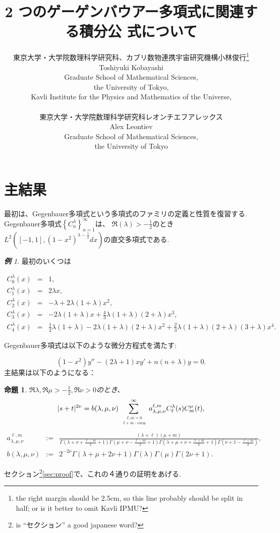 \documentclass[12pt]{article} %
\title{2 つのゲーゲンバウアー多項式に関連する積分公 式について}
\author{東京大学・大学院数理科学研究科、カブリ数物連携宇宙研究機構\quad 小林\quad 俊行\footnote{
the right margin should be 2.5cm, so this line probably should be split in half; or is it better to omit Kavli IPMU?}\\
Toshiyuki Kobayashi\\
Graduate School of Mathematical Sciences,\\
the University of Tokyo,\\
Kavli Institute for the Physics and Mathematics of the Universe,\\\\
東京大学・大学院数理科学研究科\quad レオンチエフ\quad アレックス\\
Alex Leontiev\\
Graduate School of Mathematical Sciences,\\
the University of Tokyo
}
\date{} %
\newtheorem{prop}{命題}
\theoremstyle{remark}
\newtheorem*{example*}{\textbf{例}}
\newcommand{\tmop}[1]{\ensuremath{\operatorname{#1}}}
\begin{document}
\maketitle

\section{主結果}
	最初は、Gegenbauer多項式という多項式のファミリの定義と性質を復習する.
	Gegenbauer多項式$\left\{ C_n^\lambda \right\}_{n=1}^{\infty}$は、
	$\Re(\lambda)>-\frac{1}{2}$のとき$L^2\left( [-1,1],(1-x^2)^{\lambda-\frac{1}{2}}dx \right)$の直交多項式である.
	
	\begin{example*}
		最初のいくつは
	
		\begin{eqnarray*}
			C_0^\lambda(x)&=&1,\\
			C_1^\lambda(x)&=&2\lambda x,\\
			C_2^\lambda(x)&=&-\lambda+2\lambda(1+\lambda)x^2,\\
			C_3^\lambda(x)&=&-2\lambda(1+\lambda)x+\frac{4}{3}\lambda(1+\lambda)(2+\lambda)x^3,\\
			C_4^\lambda(x)&=&\frac{1}{2}\lambda(1+\lambda)-2\lambda(1+\lambda)(2
			+\lambda)x^2+\frac{2}{3}\lambda(1+\lambda)(2+\lambda)(3+\lambda)x^4.
		\end{eqnarray*}
	\end{example*}
	Gegenbauer多項式は以下のような微分方程式を満たす:
		
	\begin{equation*}
		(1-x^2)y''-(2\lambda+1)xy'+n(n+\lambda)y=0.
	\end{equation*}
	主結果は以下のようになる：
	\begin{prop}\label{prop:exp-st-gg}
		$\Re\lambda,\Re\mu>-\frac{1}{2},\Re\nu>0$のとき、
		\begin{equation}
			| s + t |^{2 \nu} =b(\lambda,\mu,\nu) \displaystyle\sum_{\scalebox{0.6}{ $\begin{array}[]{c}
			\ell, m = 0 \\ \ell + m : \tmop{even}
		\end{array}$}}^{\infty} a_{\lambda,\mu,\nu}^{\ell,m} C_\ell^{\lambda} (s) C_m^{\mu} (t),
			\label{eqn:exp-st-gg}
		\end{equation}
		{
			\begin{equation*}
				\begin{array}{rcl}
	a_{\lambda,\mu,\nu}^{\ell,m}&:=&\frac{ (\lambda + \ell) (\mu + m)}{\Gamma \left( \lambda + \nu + \frac{\ell -
	  m}{2} + 1 \right)  \Gamma \left( \mu + \nu -
	  \frac{\ell - m}{2} + 1 \right)\Gamma \left( \lambda + \mu + \nu + \frac{\ell +
	  m}{2} + 1 \right)\Gamma\left(  \nu+1-\frac{\ell+m}{2}\right)},\\[0.4cm]
	  b(\lambda,\mu,\nu)&:=&2^{-2\nu}\Gamma (\lambda + \mu + 2 \nu + 1){\Gamma (\lambda)
	  \Gamma (\mu)\Gamma \left( 2\nu +
	1 \right)}.
			\end{array}
			\end{equation*}
	}
	\end{prop}
	セクション\footnote{is ``セクション'' a good japanese word?}\ref{sec:proof}で、これの４通りの証明をあげる.
\end{document}
